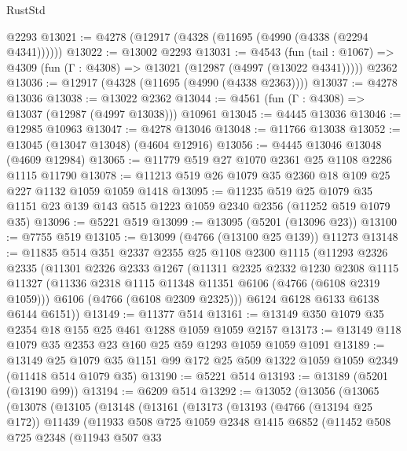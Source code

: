 \begin{lexlean}{RustStd}
\begin{coremodule}
{\begin{coremodule}
{{{{{{{{{{{{{{{{{{{{{{{{{{{{{{{{{{{    @2293
@13021 := @4278 (@12917 (@4328 (@11695 (@4990 (@4338 (@2294 @4341))))))
@13022 := @13002 @2293
@13031 := @4543
    (fun (tail : @1067) => @4309 (fun (Γ : @4308) => @13021 (@12987 (@4997 (@13022 @4341)))))
    @2362
@13036 := @12917 (@4328 (@11695 (@4990 (@4338 @2363))))
@13037 := @4278 @13036
@13038 := @13022 @2362
@13044 := @4561 (fun (Γ : @4308) => @13037 (@12987 (@4997 @13038))) @10961
@13045 := @4445 @13036
@13046 := @12985 @10963
@13047 := @4278 @13046
@13048 := @11766 @13038
@13052 := @13045 (@13047 @13048) (@4604 @12916)
@13056 := @4445 @13046 @13048 (@4609 @12984)
@13065 := @11779 @519 @27 @1070 @2361 @25 @1108 @2286 @1115 @11790
@13078 := @11213 @519 @26 @1079 @35 @2360 @18 @109 @25 @227 @1132 @1059 @1059 @1418
@13095 := @11235
    @519
    @25
    @1079
    @35
    @1151
    @23
    @139
    @143
    @515
    @1223
    @1059
    @2340
    @2356
    (@11252 @519 @1079 @35)
@13096 := @5221 @519
@13099 := @13095 (@5201 (@13096 @23))
@13100 := @7755 @519
@13105 := @13099 (@4766 (@13100 @25 @139)) @11273
@13148 := @11835
    @514
    @351
    @2337
    @2355
    @25
    @1108
    @2300
    @1115
    (@11293
      @2326
      @2335
      (@11301
        @2326
        @2333
        @1267
        (@11311
          @2325
          @2332
          @1230
          @2308
          @1115
          @11327
          (@11336 @2318 @1115 @11348 @11351 @6106 (@4766 (@6108 @2319 @1059)))
          @6106
          (@4766 (@6108 @2309 @2325)))
        @6124
        @6128
        @6133
        @6138
        @6144
        @6151))
@13149 := @11377 @514
@13161 := @13149 @350 @1079 @35 @2354 @18 @155 @25 @461 @1288 @1059 @1059 @2157
@13173 := @13149 @118 @1079 @35 @2353 @23 @160 @25 @59 @1293 @1059 @1059 @1091
@13189 := @13149
    @25
    @1079
    @35
    @1151
    @99
    @172
    @25
    @509
    @1322
    @1059
    @1059
    @2349
    (@11418 @514 @1079 @35)
@13190 := @5221 @514
@13193 := @13189 (@5201 (@13190 @99))
@13194 := @6209 @514
@13292 := @13052
    (@13056
      (@13065
        (@13078
          (@13105
            (@13148
              (@13161
                (@13173
                  (@13193
                    (@4766 (@13194 @25 @172))
                    @11439
                    (@11933
                      @508
                      @725
                      @1059
                      @2348
                      @1415
                      @6852
                      (@11452
                        @508
                        @725
                        @2348
                        (@11943
                          @507
                          @33
}}}}}}}}}}}}}}}}}}}}}}}}}}}}}}}}}}}
\end{coremodule}}
\end{coremodule}
\end{lexlean}
